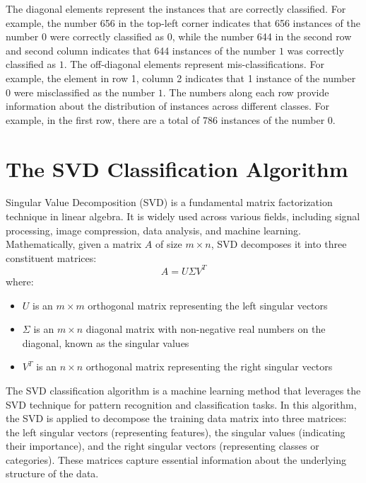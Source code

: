 \documentclass{article} %
\begin{document}
            \FloatBarrier
            \noindent The diagonal elements represent the instances that are correctly classified. For example, the number 656 in the top-left corner indicates that 656 instances of the number $0$ were correctly classified as $0$, while the number 644 in the second row and second column indicates that 644 instances of the number $1$ was correctly classified as $1$. The off-diagonal elements represent mis-classifications. For example, the element in row 1, column 2 indicates that 1 instance of the number $0$ were misclassified as the number $1$. The numbers along each row provide information about the distribution of instances across different classes. For example, in the first row, there are a total of 786 instances of the number $0$. \\


  \section{The SVD Classification Algorithm}
    Singular Value Decomposition (SVD) is a fundamental matrix factorization technique in linear algebra. It is widely used across various fields, including signal processing, image compression, data analysis, and machine learning. Mathematically, given a matrix $A$ of size $m\times n$, SVD decomposes it into three constituent matrices:
    \begin{equation}
        A = U\Sigma V^T
    \end{equation}
    where:
    \begin{itemize}
        \item $U$ is an $m\times m$ orthogonal matrix representing the left singular vectors
        \item $\Sigma$ is an $m \times n$ diagonal matrix with non-negative real numbers on the diagonal, known as the singular values
        \item $V^T$ is an $n \times n$ orthogonal matrix representing the right singular vectors
    \end{itemize}
    The SVD classification algorithm is a machine learning method that leverages the SVD technique for pattern recognition and classification tasks. In this algorithm, the SVD is applied to decompose the training data matrix into three matrices: the left singular vectors (representing features), the singular values (indicating their importance), and the right singular vectors (representing classes or categories). These matrices capture essential information about the underlying structure of the data.
\end{document}
